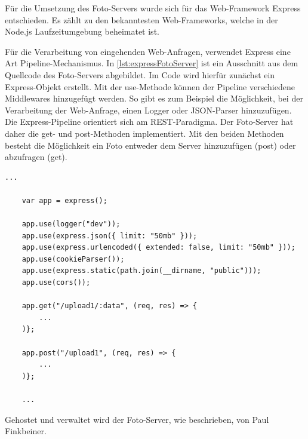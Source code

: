 Für die Umsetzung des Foto-Servers wurde sich für das Web-Framework \glqq Express\grqq{} entschieden. Es zählt zu den bekanntesten Web-Frameworks, welche in der Node.js Laufzeitumgebung beheimatet ist.

Für die Verarbeitung von eingehenden Web-Anfragen, verwendet Express eine Art Pipeline-Mechanismus. In \autoref{lst:expressFotoServer} ist ein Ausschnitt aus dem Quellcode des Foto-Servers abgebildet. Im Code wird hierfür zunächst ein Express-Objekt erstellt. Mit der use-Methode können der Pipeline verschiedene Middlewares hinzugefügt werden. So gibt es zum Beispiel die Möglichkeit, bei der Verarbeitung der Web-Anfrage, einen Logger oder JSON-Parser hinzuzufügen. Die Express-Pipeline orientiert sich am REST-Paradigma. Der Foto-Server hat daher die get- und post-Methoden implementiert. Mit den beiden Methoden besteht die Möglichkeit ein Foto entweder dem Server hinzuzufügen (post) oder abzufragen (get).

\begin{lstlisting}[label=lst:expressFotoServer, caption={Codeausschnitt aus dem Foto-Server}, captionpos=b]
    ...

    var app = express();

    app.use(logger("dev"));
    app.use(express.json({ limit: "50mb" }));
    app.use(express.urlencoded({ extended: false, limit: "50mb" }));
    app.use(cookieParser());
    app.use(express.static(path.join(__dirname, "public")));
    app.use(cors());

    app.get("/upload1/:data", (req, res) => {
        ...
    )};

    app.post("/upload1", (req, res) => {
        ...
    )};

    ...
\end{lstlisting}

Gehostet und verwaltet wird der Foto-Server, wie beschrieben, von Paul Finkbeiner. 